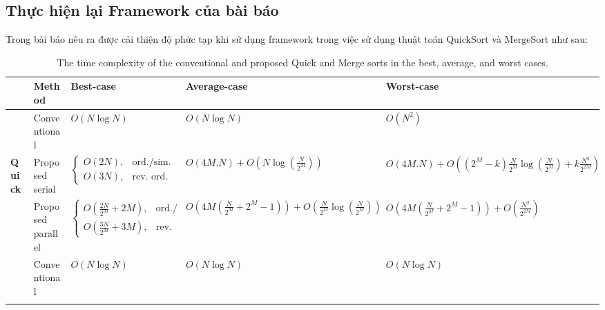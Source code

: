 \subsection{Thực hiện lại Framework của bài báo}

Trong bài báo nêu ra được cải thiện độ phức tạp khi sử dụng framework trong việc sử dụng thuật toán QuickSort và MergeSort như sau:

\begin{table}[H]
	\renewcommand{\arraystretch}{2.2}
	\fontsize{11}{13}\selectfont
	\caption{The time complexity of the conventional and proposed Quick and Merge sorts in the best, average, and worst cases.} 
	\label{tab:complexity}
	\hspace*{-1.5cm}%
	\begin{tabular}{|>{\centering\arraybackslash}m{1.5cm}
			|>{\centering\arraybackslash}m{2.5cm}
			|>{\centering\arraybackslash}m{4.5cm}
			|>{\centering\arraybackslash}m{4.5cm}
			|>{\centering\arraybackslash}m{4.5cm}|}
		
		\hline
		\textbf{} & \textbf{Method} & \textbf{Best-case} & \textbf{Average-case} & \textbf{Worst-case} \\
		\hline
		
		& Conventional & $O(N \log N)$ & $O(N \log N)$ & $O(N^2)$ \\ \cline{2-5}
		
		\textbf{Quick} & Proposed serial & $\begin{cases} O(2N), & \text{ord./sim.} \\ O(3N), & \text{rev. ord.} \end{cases}$ & $O(4M.N) + O(N \log(\frac{N}{2^M}))$ & $O(4M.N) + O((2^M - k)\frac{N}{2^M} \log(\frac{N}{2^M}) + k\frac{N^2}{2^{2M}})$ \\ \cline{2-5}       
		
		& Proposed parallel & $\begin{cases} O(\frac{2N}{2^M} + 2M), & \text{ord./sim.} \\ O(\frac{3N}{2^M} + 3M), & \text{rev. ord.} \end{cases}$ & $O(4M(\frac{N}{2^M} + 2^M - 1)) + O(\frac{N}{2^M} \log(\frac{N}{2^M}))$ & $O(4M(\frac{N}{2^M} + 2^M - 1)) + O(\frac{N^2}{2^{2M}})$ \\ \hline
		
		& Conventional & $O(N \log N)$ & $O(N \log N)$ & $O(N \log N)$ \\ \cline{2-5}
		

\end{tabular}
\end{table}
